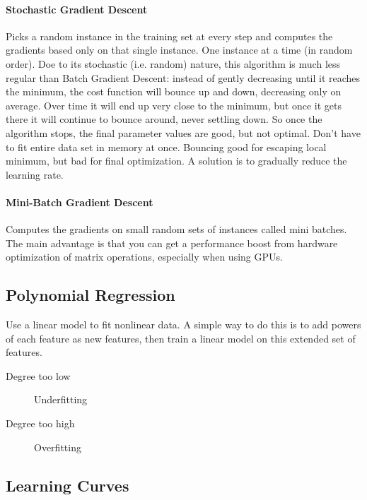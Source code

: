 \documentclass[10pt]{article}
\begin{document}
  \paragraph{Stochastic Gradient Descent}%
  \label{par:stochastic_gradient_descent}

  Picks a random instance in the training set at every step and computes the
  gradients based only on that single instance. One instance at a time (in random
  order). Doe to its stochastic (i.e. random) nature, this algorithm is much
  less regular than Batch Gradient Descent: instead of gently decreasing until it
  reaches the minimum, the cost function will bounce up and down, decreasing only
  on average. Over time it will end up very close to the minimum, but once it
  gets there it will continue to bounce around, never settling down. So once the
  algorithm stops, the final parameter values are good, but not optimal. Don't
  have to fit entire data set in memory at once. Bouncing good for escaping local
  minimum, but bad for final optimization. A solution is to gradually reduce the
  learning rate.

  \paragraph{Mini-Batch Gradient Descent}%
  \label{par:mini_batch_gradient_descent}

  Computes the gradients on small random sets of instances called mini batches. The
  main advantage is that you can get a performance boost from hardware
  optimization of matrix operations, especially when using GPUs.

  \subsection{Polynomial Regression}%
  \label{sub:polynomial_regression}

  Use a linear model to fit nonlinear data. A simple way to do this is to add
  powers of each feature as new features, then train a linear model on this
  extended set of features.
  \begin{description}
    \item[Degree too low] Underfitting
    \item[Degree too high] Overfitting
  \end{description}

  \subsection{Learning Curves}%
  \label{sub:learning_curves}
\end{document}
